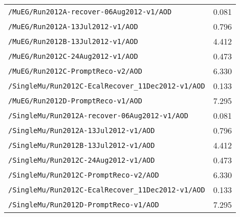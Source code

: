 \begin{table}[hbt]
\begin{center}
\begin{tabular}{lc}
\verb=/MuEG/Run2012A-recover-06Aug2012-v1/AOD=                              & 0.081            \\ 
\verb=/MuEG/Run2012A-13Jul2012-v1/AOD=                                                   & 0.796             \\ 
\verb=/MuEG/Run2012B-13Jul2012-v1/AOD=                                             & 4.412 \\ 
\verb=/MuEG/Run2012C-24Aug2012-v1/AOD=                                         & 0.473               \\ 
\verb=/MuEG/Run2012C-PromptReco-v2/AOD=                                         & 6.330              \\ 
\verb=/SingleMu/Run2012C-EcalRecover_11Dec2012-v1/AOD=           & 0.133\\
\verb=/MuEG/Run2012D-PromptReco-v1/AOD=                                      &  7.295 \\

\verb=/SingleMu/Run2012A-recover-06Aug2012-v1/AOD=                              & 0.081          \\ 
\verb=/SingleMu/Run2012A-13Jul2012-v1/AOD=                                           & 0.796                \\ 
\verb=/SingleMu/Run2012B-13Jul2012-v1/AOD=                                       & 4.412 \\ 
\verb=/SingleMu/Run2012C-24Aug2012-v1/AOD=                                        & 0.473               \\ 
\verb=/SingleMu/Run2012C-PromptReco-v2/AOD=                                      & 6.330                \\ 
\verb=/SingleMu/Run2012C-EcalRecover_11Dec2012-v1/AOD=           & 0.133 \\
\verb=/SingleMu/Run2012D-PromptReco-v1/AOD=                                     &  7.295 \\



 \hline\hline
\end{tabular}

\end{center}
\end{table}








